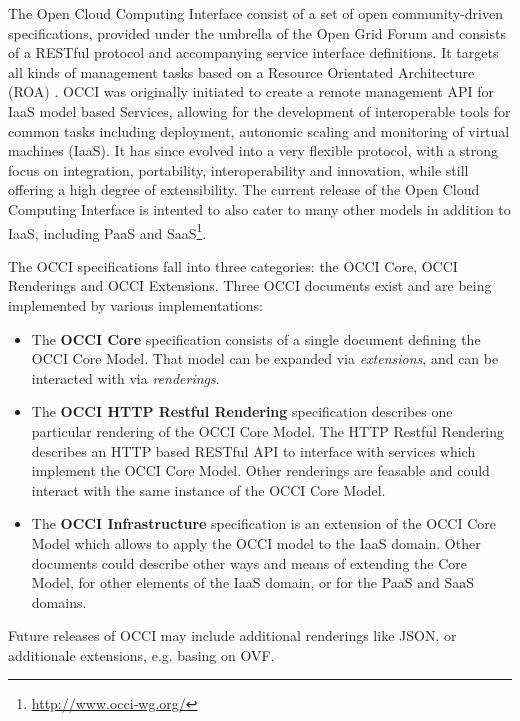 \documentclass[10pt,conference,final,letterpaper,twoside,twocolumn,]{IEEEtran}
\newcommand{\I}[1]{\textit{#1}}
\newcommand{\B}[1]{\textbf{#1}}
\begin{document}
 The Open Cloud Computing Interface consist of a set of open
 community-driven specifications, provided under the umbrella of the
 Open Grid Forum and consists of a RESTful \cite{REST_Fielding}
 protocol and accompanying service interface definitions.  It targets
 all kinds of management tasks based on a Resource Orientated
 Architecture (ROA) \cite{RR2007}.  OCCI was originally initiated to
 create a remote management API for IaaS model based Services,
 allowing for the development of interoperable tools for common tasks
 including deployment, autonomic scaling and monitoring of virtual
 machines (IaaS).  It has since evolved into a very flexible protocol,
 with a strong focus on integration, portability, interoperability and
 innovation, while still offering a high degree of extensibility.  The
 current release of the Open Cloud Computing Interface is intented to
 also cater to many other models in addition to IaaS, including PaaS
 and SaaS\footnote{\url{http://www.occi-wg.org/}}.

 The OCCI specifications fall into three categories: the OCCI Core,
 OCCI Renderings and OCCI Extensions.  Three OCCI documents exist and
 are being implemented by various implementations:
 
 \begin{itemize}
 
  \item The \B{OCCI Core} specification consists of a single document
  defining the OCCI Core Model. That model can be expanded via
  \I{extensions}, and can be interacted with via \I{renderings}.

  \item The \B{OCCI HTTP Restful Rendering} specification describes
  one particular rendering of the OCCI Core Model.  The HTTP Restful
  Rendering describes an HTTP based RESTful API to interface with
  services which implement the OCCI Core Model.  Other renderings are
  feasable and could interact with the same instance of the OCCI Core
  Model.  
 
  \item The \B{OCCI Infrastructure} specification is an extension of
  the OCCI Core Model which allows to apply the OCCI model to the IaaS
  domain. Other documents could describe other ways and means of
  extending the Core Model, for other elements of the IaaS domain, or
  for the PaaS and SaaS domains.  
  
 \end{itemize}

 Future releases of OCCI may include additional renderings like JSON,
 or additionale extensions, e.g. basing on OVF.
\end{document}
